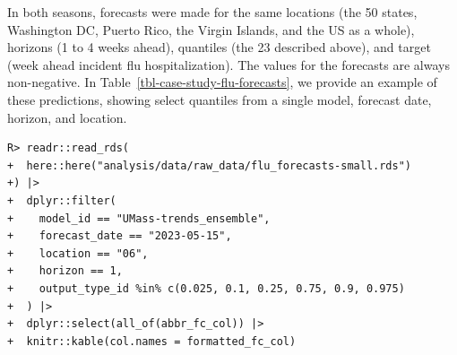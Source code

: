 \documentclass[
  article,
  shortnames,
  notitle]{jss}
\begin{document}
In both seasons, forecasts were made for the same locations (the 50
states, Washington DC, Puerto Rico, the Virgin Islands, and the US as a
whole), horizons (1 to 4 weeks ahead), quantiles (the 23 described
above), and target (week ahead incident flu hospitalization). The values
for the forecasts are always non-negative. In
Table~\ref{tbl-case-study-flu-forecasts}, we provide an example of these
predictions, showing select quantiles from a single model, forecast
date, horizon, and location.

\begin{verbatim}
R> readr::read_rds(
+  here::here("analysis/data/raw_data/flu_forecasts-small.rds")
+) |>
+  dplyr::filter(
+    model_id == "UMass-trends_ensemble",
+    forecast_date == "2023-05-15",
+    location == "06",
+    horizon == 1,
+    output_type_id %in% c(0.025, 0.1, 0.25, 0.75, 0.9, 0.975)
+  ) |>
+  dplyr::select(all_of(abbr_fc_col)) |>
+  knitr::kable(col.names = formatted_fc_col)
\end{verbatim}
\end{document}
